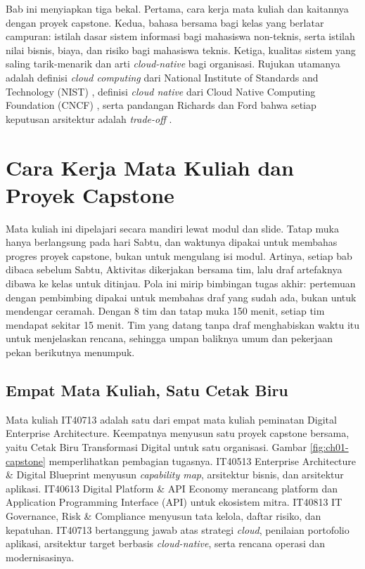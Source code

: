 Bab ini menyiapkan tiga bekal. Pertama, cara kerja mata kuliah dan kaitannya dengan
proyek capstone. Kedua, bahasa bersama bagi kelas yang berlatar campuran: istilah dasar
sistem informasi bagi mahasiswa non-teknis, serta istilah nilai bisnis, biaya, dan
risiko bagi mahasiswa teknis. Ketiga, kualitas sistem yang saling tarik-menarik dan
arti \textit{cloud-native} bagi organisasi. Rujukan utamanya adalah definisi
\textit{cloud computing} dari National Institute of Standards and Technology (NIST)
\cite{nist800-145}, definisi \textit{cloud native} dari Cloud Native Computing
Foundation (CNCF) \cite{cncf-definition}, serta pandangan Richards dan Ford bahwa setiap
keputusan arsitektur adalah \textit{trade-off} \cite{richards2025}.

\section{Cara Kerja Mata Kuliah dan Proyek Capstone}

Mata kuliah ini dipelajari secara mandiri lewat modul dan slide. Tatap muka hanya
berlangsung pada hari Sabtu, dan waktunya dipakai untuk membahas progres proyek
capstone, bukan untuk mengulang isi modul. Artinya, setiap bab dibaca sebelum Sabtu,
Aktivitas dikerjakan bersama tim, lalu draf artefaknya dibawa ke kelas untuk ditinjau.
Pola ini mirip bimbingan tugas akhir: pertemuan dengan pembimbing dipakai untuk membahas
draf yang sudah ada, bukan untuk mendengar ceramah. Dengan 8 tim dan tatap muka 150
menit, setiap tim mendapat sekitar 15 menit. Tim yang datang tanpa draf menghabiskan
waktu itu untuk menjelaskan rencana, sehingga umpan baliknya umum dan pekerjaan pekan
berikutnya menumpuk.

\subsection{Empat Mata Kuliah, Satu Cetak Biru}

Mata kuliah IT40713 adalah satu dari empat mata kuliah peminatan Digital Enterprise
Architecture. Keempatnya menyusun satu proyek capstone bersama, yaitu Cetak Biru
Transformasi Digital untuk satu organisasi. Gambar \ref{fig:ch01-capstone}
memperlihatkan pembagian tugasnya. IT40513 Enterprise Architecture \& Digital Blueprint
menyusun \textit{capability map}, arsitektur bisnis, dan arsitektur aplikasi. IT40613
Digital Platform \& API Economy merancang platform dan Application Programming Interface
(API) untuk ekosistem mitra. IT40813 IT Governance, Risk \& Compliance menyusun tata
kelola, daftar risiko, dan kepatuhan. IT40713 bertanggung jawab atas strategi
\textit{cloud}, penilaian portofolio aplikasi, arsitektur target berbasis
\textit{cloud-native}, serta rencana operasi dan modernisasinya.

